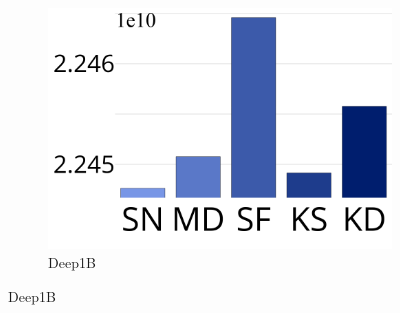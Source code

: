 \begin{figure}[htp]
\begin{subfigure}{\sfig\columnwidth}
			\centering
			\captionsetup{justification=centering}	
			\includegraphics[width=\textwidth]{../img/Experiments/EP/DEEP_1B_100.png}
		\caption{{Deep1B}}
		\label{fig:ss:deep1b}
		\end{subfigure}	


\end{figure}
